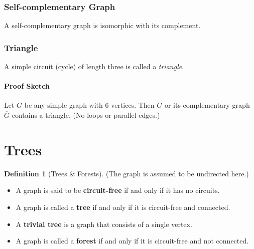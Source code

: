 \documentclass{article}
\theoremstyle{plain}
\theoremstyle{definition}
\newtheorem*{definition}{Definition}
\theoremstyle{remark}
\begin{document}
\subsubsection*{Self-complementary Graph}
A self-complementary graph is isomorphic with its complement.
 
\subsubsection*{Triangle}
A simple circuit (cycle) of length three is called a \emph{triangle}.
 
\paragraph{Proof Sketch} Let $G$ be any simple graph with 6 vertices. Then $G$ or its complementary graph $\overline{G}$ contains a triangle. (No loops or parallel edges.)
 
\section{Trees}
 
\begin{definition}[Trees \& Forests]
    (The graph is assumed to be undirected here.)
    \begin{itemize}
        \item A graph is said to be \textbf{circuit-free} if and only if it has no circuits.
        \item A graph is called a \textbf{tree} if and only if it is circuit-free and connected.
        \item A \textbf{trivial tree} is a graph that consists of a single vertex.
        \item A graph is called a \textbf{forest} if and only if it is circuit-free and not connected.
    \end{itemize}
\end{definition}
\end{document}
